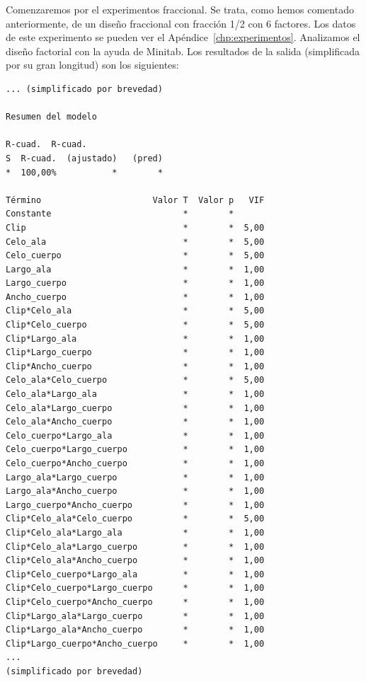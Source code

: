 \documentclass[12pt,a4paper,twoside,openright,titlepage,final]{article}
\begin{document}
Comenzaremos por el experimentos fraccional. Se trata, como hemos comentado anteriormente, de un diseño fraccional con fracción 1/2 con 6 factores. Los datos de este experimento se pueden ver el Apéndice~\ref{chp:experimentos}. Analizamos el diseño factorial con la ayuda de Minitab. Los resultados de la salida (simplificada por su gran longitud) son los siguientes:

\begin{verbatim}
... (simplificado por brevedad)

Resumen del modelo

R-cuad.  R-cuad.
S  R-cuad.  (ajustado)   (pred)
*  100,00%           *        *

Término                      Valor T  Valor p   VIF
Constante                          *        *
Clip                               *        *  5,00
Celo_ala                           *        *  5,00
Celo_cuerpo                        *        *  5,00
Largo_ala                          *        *  1,00
Largo_cuerpo                       *        *  1,00
Ancho_cuerpo                       *        *  1,00
Clip*Celo_ala                      *        *  5,00
Clip*Celo_cuerpo                   *        *  5,00
Clip*Largo_ala                     *        *  1,00
Clip*Largo_cuerpo                  *        *  1,00
Clip*Ancho_cuerpo                  *        *  1,00
Celo_ala*Celo_cuerpo               *        *  5,00
Celo_ala*Largo_ala                 *        *  1,00
Celo_ala*Largo_cuerpo              *        *  1,00
Celo_ala*Ancho_cuerpo              *        *  1,00
Celo_cuerpo*Largo_ala              *        *  1,00
Celo_cuerpo*Largo_cuerpo           *        *  1,00
Celo_cuerpo*Ancho_cuerpo           *        *  1,00
Largo_ala*Largo_cuerpo             *        *  1,00
Largo_ala*Ancho_cuerpo             *        *  1,00
Largo_cuerpo*Ancho_cuerpo          *        *  1,00
Clip*Celo_ala*Celo_cuerpo          *        *  5,00
Clip*Celo_ala*Largo_ala            *        *  1,00
Clip*Celo_ala*Largo_cuerpo         *        *  1,00
Clip*Celo_ala*Ancho_cuerpo         *        *  1,00
Clip*Celo_cuerpo*Largo_ala         *        *  1,00
Clip*Celo_cuerpo*Largo_cuerpo      *        *  1,00
Clip*Celo_cuerpo*Ancho_cuerpo      *        *  1,00
Clip*Largo_ala*Largo_cuerpo        *        *  1,00
Clip*Largo_ala*Ancho_cuerpo        *        *  1,00
Clip*Largo_cuerpo*Ancho_cuerpo     *        *  1,00
... 
(simplificado por brevedad)

\end{verbatim}
\end{document}
